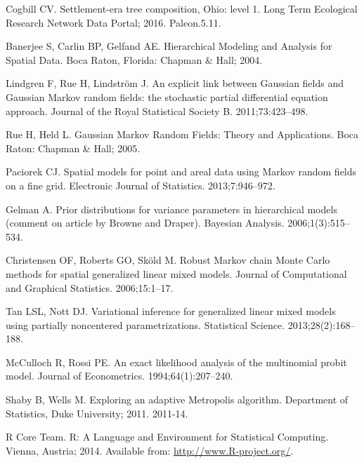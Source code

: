 \documentclass[10pt,letterpaper]{article}
\begin{document}
\begin{thebibliography}{10}
Cogbill CV.
\newblock Settlement-era tree composition, {O}hio: level 1.
\newblock Long Term Ecological Research Network Data Portal; 2016. Paleon.5.11.

Banerjee S, Carlin BP, Gelfand AE.
\newblock Hierarchical Modeling and Analysis for Spatial Data.
\newblock Boca Raton, Florida: Chapman \& Hall; 2004.

Lindgren F, Rue H, Lindstr{\"o}m J.
\newblock An explicit link between {G}aussian fields and {G}aussian {M}arkov
  random fields: the stochastic partial differential equation approach.
\newblock Journal of the Royal Statistical Society B. 2011;73:423--498.

Rue H, Held L.
\newblock Gaussian {M}arkov Random Fields: Theory and Applications.
\newblock Boca Raton: Chapman \& Hall; 2005.

Paciorek CJ.
\newblock Spatial models for point and areal data using {M}arkov random fields
  on a fine grid.
\newblock Electronic Journal of Statistics. 2013;7:946--972.

Gelman A.
\newblock Prior distributions for variance parameters in hierarchical models
  (comment on article by {B}rowne and {D}raper).
\newblock Bayesian Analysis. 2006;1(3):515--534.

Christensen OF, Roberts GO, Sk{\"o}ld M.
\newblock Robust {M}arkov chain {M}onte {C}arlo methods for spatial generalized
  linear mixed models.
\newblock Journal of Computational and Graphical Statistics. 2006;15:1--17.

Tan LSL, Nott DJ.
\newblock Variational inference for generalized linear mixed models using
  partially noncentered parametrizations.
\newblock Statistical Science. 2013;28(2):168--188.

McCulloch R, Rossi PE.
\newblock An exact likelihood analysis of the multinomial probit model.
\newblock Journal of Econometrics. 1994;64(1):207--240.

Shaby B, Wells M.
\newblock Exploring an adaptive {M}etropolis algorithm.
\newblock Department of Statistics, Duke University; 2011. 2011-14.

{R Core Team}. R: A Language and Environment for Statistical Computing.
\newblock Vienna, Austria; 2014.
\newblock Available from: \url{http://www.R-project.org/}.


\end{thebibliography}
\end{document}
